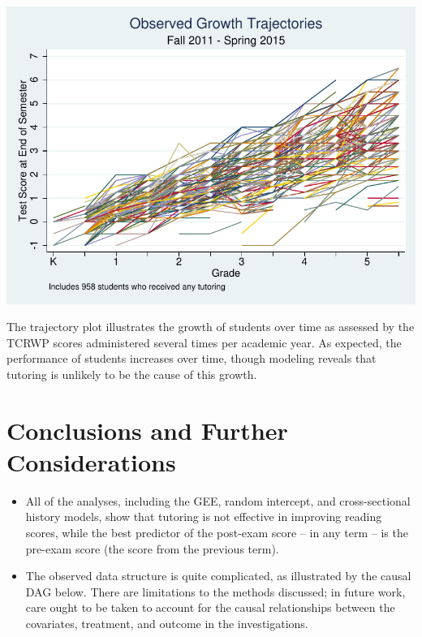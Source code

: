\documentclass[a0,landscape]{a0poster}
\begin{document}
\begin{multicols}{3}
\begin{center}\vspace{1cm}
\includegraphics[width=0.8\linewidth]{xtline.pdf}
\end{center}\vspace{0.5cm}

The trajectory plot illustrates the growth of students over time as assessed by the TCRWP scores administered several times per academic year. As expected, the performance of students increases over time, though modeling reveals that tutoring is unlikely to be the cause of this growth.


\color{SaddleBrown} %

\section*{Conclusions and Further Considerations}

\begin{itemize}
\item All of the analyses, including the GEE, random intercept, and cross-sectional history models, show that tutoring is not effective in improving reading scores, while the best predictor of the post-exam score -- in any term -- is the pre-exam score (the score from the previous term).
\item The observed data structure is quite complicated, as illustrated by the causal DAG below. There are limitations to the methods discussed; in future work, care ought to be taken to account for the causal relationships between the covariates, treatment, and outcome in the investigations.
\end{itemize}


\end{multicols}
\end{document}
